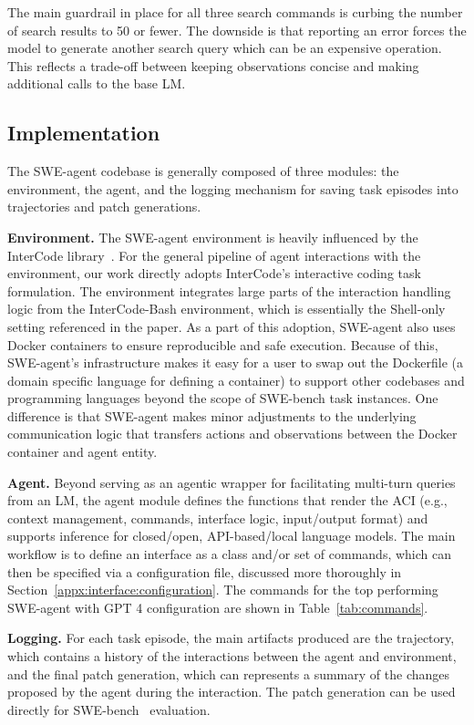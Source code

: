 The main guardrail in place for all three search commands is curbing the number of search results to \num{50} or fewer.
The downside is that reporting an error forces the model to generate another search query which can be an expensive operation.
This reflects a trade-off between keeping observations concise and making additional calls to the base LM.

\subsection{Implementation}
\label{appx:interface:implementation}

The SWE-agent codebase is generally composed of three modules: the environment, the agent, and the logging mechanism for saving task episodes into trajectories and patch generations.

\textbf{Environment.}
The SWE-agent environment is heavily influenced by the InterCode library~\citep{yang2023intercode}.
For the general pipeline of agent interactions with the environment, our work directly adopts InterCode's interactive coding task formulation.
The environment integrates large parts of the interaction handling logic from the InterCode-Bash environment, which is essentially the Shell-only setting referenced in the paper.
As a part of this adoption, SWE-agent also uses Docker containers to ensure reproducible and safe execution.
Because of this, SWE-agent's infrastructure makes it easy for a user to swap out the Dockerfile (a domain specific language for defining a container) to support other codebases and programming languages beyond the scope of SWE-bench task instances.
One difference is that SWE-agent makes minor adjustments to the underlying communication logic that transfers actions and observations between the Docker container and agent entity.

\textbf{Agent.}
Beyond serving as an agentic wrapper for facilitating multi-turn queries from an LM, the agent module defines the functions that render the ACI (e.g., context management, commands, interface logic, input/output format) and supports inference for closed/open, API-based/local language models.
The main workflow is to define an interface as a class and/or set of commands, which can then be specified via a configuration file, discussed more thoroughly in Section~\ref{appx:interface:configuration}.
The commands for the top performing SWE-agent with GPT 4 configuration are shown in Table~\ref{tab:commands}.

\textbf{Logging.}
For each task episode, the main artifacts produced are the trajectory, which contains a history of the interactions between the agent and environment, and the final patch generation, which can represents a summary of the changes proposed by the agent during the interaction.
The patch generation can be used directly for SWE-bench~\citep{jimenez2024swebench} evaluation.

